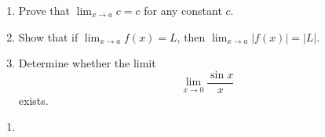 \documentclass[12pt]{article}
\theoremstyle{definition}
\begin{document}
\begin{enumerate}
    \item Prove that $\lim_{x \to a} c = c$ for any constant $c$.
    \item Show that if $\lim_{x \to a} f(x) = L$, then
    $\lim_{x \to a} |f(x)| = |L|$.
    \item Determine whether the limit
    \[
    \lim_{x \to 0} \frac{\sin x}{x}
    \]
    exists.
\end{enumerate}

\item %
    \begin{enumerate}
        \item 
    \end{enumerate}
\end{document}
